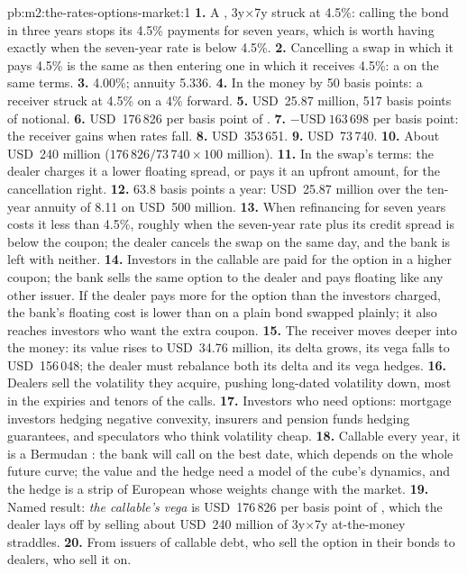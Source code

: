 \begin{solution}{pb:m2:the-rates-options-market:1}
\textbf{1.} A , 3y$\times$7y struck at 4.5\%: calling the bond in
three years stops its 4.5\% payments for seven years, which is worth having
exactly when the seven-year rate is below 4.5\%.
\textbf{2.} Cancelling a swap in which it pays 4.5\% is the same as then entering
one in which it receives 4.5\%: a  on the same terms.
\textbf{3.} 4.00\%; annuity 5.336.
\textbf{4.} In the money by 50 basis points: a receiver struck at 4.5\% on a 4\%
forward.
\textbf{5.} USD~25.87 million, 517 basis points of notional.
\textbf{6.} USD~176\,826 per basis point of .
\textbf{7.} $-\text{USD}~163\,698$ per basis point: the receiver gains when rates
fall.
\textbf{8.} USD~353\,651.
\textbf{9.} USD~73\,740.
\textbf{10.} About USD~240 million ($176\,826/73\,740 \times 100$ million).
\textbf{11.} In the swap's terms: the dealer charges it a lower floating spread,
or pays it an upfront amount, for the cancellation right.
\textbf{12.} 63.8 basis points a year: USD~25.87 million over the ten-year
annuity of 8.11 on USD~500 million.
\textbf{13.} When refinancing for seven years costs it less than 4.5\%, roughly
when the seven-year rate plus its credit spread is below the coupon; the dealer
cancels the swap on the same day, and the bank is left with neither.
\textbf{14.} Investors in the callable are paid for the option in a higher
coupon; the bank sells the same option to the dealer and pays floating like any
other issuer. If the dealer pays more for the option than the investors
charged, the bank's floating cost is lower than on a plain bond swapped plainly;
it also reaches investors who want the extra coupon.
\textbf{15.} The receiver moves deeper into the money: its value rises to
USD~34.76 million, its delta grows, its vega falls to USD~156\,048; the dealer
must rebalance both its delta and its vega hedges.
\textbf{16.} Dealers sell the volatility they acquire, pushing long-dated
volatility down, most in the expiries and tenors of the calls.
\textbf{17.} Investors who need options: mortgage investors hedging negative
convexity, insurers and pension funds hedging guarantees, and speculators who
think volatility cheap.
\textbf{18.} Callable every year, it is a Bermudan : the bank will call on
the best date, which depends on the whole future curve; the value and the
hedge need a model of the cube's dynamics, and the hedge is a strip of
European  whose weights change with the market.
\textbf{19.} Named result: \emph{the callable's vega} is USD~176\,826 per basis
point of , which the dealer lays off by selling about USD~240
million of 3y$\times$7y at-the-money straddles.
\textbf{20.} From issuers of callable debt, who sell the option in their bonds to
dealers, who sell it on.
\end{solution}

